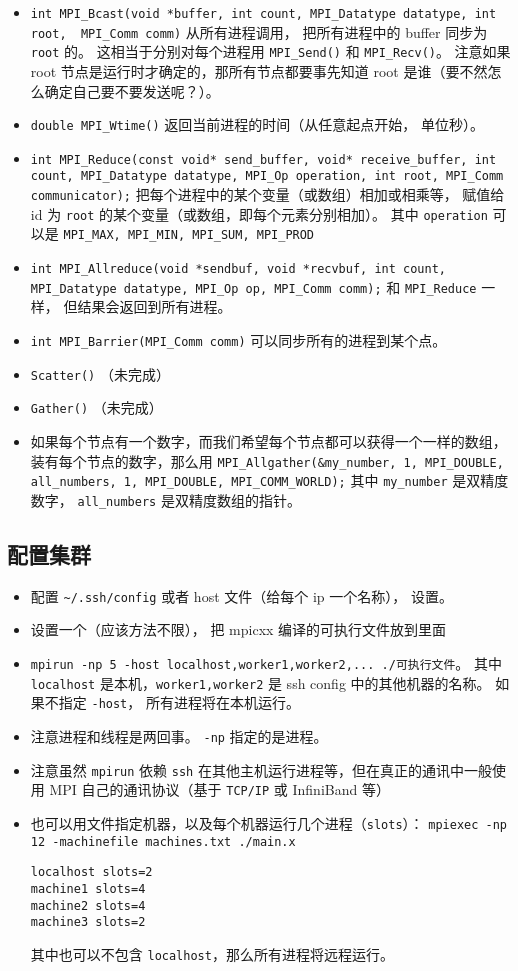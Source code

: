 \begin{itemize}
\item \verb`int MPI_Bcast(void *buffer, int count, MPI_Datatype datatype, int root,  MPI_Comm comm)` 从所有进程调用， 把所有进程中的 buffer 同步为 \verb`root` 的。 这相当于分别对每个进程用 \verb`MPI_Send()` 和 \verb`MPI_Recv()`。 注意如果 root 节点是运行时才确定的，那所有节点都要事先知道 root 是谁（要不然怎么确定自己要不要发送呢？）。
\item \verb`double MPI_Wtime()` 返回当前进程的时间（从任意起点开始， 单位秒）。
\item \verb`int MPI_Reduce(const void* send_buffer, void* receive_buffer, int count, MPI_Datatype datatype, MPI_Op operation, int root, MPI_Comm communicator);` 把每个进程中的某个变量（或数组）相加或相乘等， 赋值给 id 为 \verb`root` 的某个变量（或数组，即每个元素分别相加）。 其中 \verb`operation` 可以是 \verb`MPI_MAX, MPI_MIN, MPI_SUM, MPI_PROD`
\item \verb`int MPI_Allreduce(void *sendbuf, void *recvbuf, int count, MPI_Datatype datatype, MPI_Op op, MPI_Comm comm);` 和 \verb`MPI_Reduce` 一样， 但结果会返回到所有进程。
\item \verb`int MPI_Barrier(MPI_Comm comm)` 可以同步所有的进程到某个点。
\item \verb`Scatter()` （未完成）
\item \verb`Gather()` （未完成）
\item 如果每个节点有一个数字，而我们希望每个节点都可以获得一个一样的数组，装有每个节点的数字，那么用 \verb`MPI_Allgather(&my_number, 1, MPI_DOUBLE, all_numbers, 1, MPI_DOUBLE, MPI_COMM_WORLD);` 其中 \verb`my_number` 是双精度数字， \verb`all_numbers` 是双精度数组的指针。
\end{itemize}

\subsection{配置集群}
\begin{itemize}
\item 配置 \verb`~/.ssh/config` 或者 host 文件（给每个 ip 一个名称）， 设置。
\item 设置一个（应该方法不限）， 把 mpicxx 编译的可执行文件放到里面
\item \verb`mpirun -np 5 -host localhost,worker1,worker2,... ./可执行文件`。 其中 \verb`localhost` 是本机，\verb`worker1,worker2` 是 ssh config 中的其他机器的名称。 如果不指定 \verb`-host`， 所有进程将在本机运行。
\item 注意进程和线程是两回事。 \verb`-np` 指定的是进程。
\item 注意虽然 \verb`mpirun` 依赖 \verb`ssh` 在其他主机运行进程等，但在真正的通讯中一般使用 MPI 自己的通讯协议（基于 \verb`TCP/IP` 或 InfiniBand 等）
\item 也可以用文件指定机器，以及每个机器运行几个进程（\verb`slots`）： \verb`mpiexec -np 12 -machinefile machines.txt ./main.x`
\begin{lstlisting}[language=none,caption=machines.txt]
localhost slots=2
machine1 slots=4
machine2 slots=4
machine3 slots=2
\end{lstlisting}
其中也可以不包含 \verb`localhost`，那么所有进程将远程运行。
\end{itemize}
